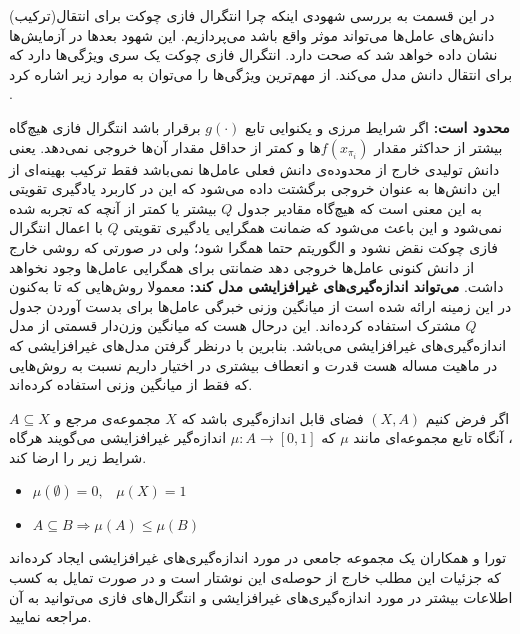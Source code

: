 در این قسمت به بررسی شهودی اینکه چرا انتگرال فازی چوکت برای انتقال(ترکیب) دانش‌های عامل‌ها می‌تواند موثر واقع باشد می‌پردازیم. این شهود بعدها در آزمایش‌ها نشان داده خواهد شد که صحت دارد. انتگرال فازی چوکت یک سری ویژگی‌ها دارد که برای انتقال دانش مدل می‌کند. از مهم‌ترین ویژگی‌ها را می‌توان به موارد زیر اشاره کرد .
\begin{enumerate}
 \textbf{محدود است:} اگر شرایط مرزی و یکنوایی تابع $g(\cdot)$ برقرار باشد انتگرال‌ فازی هیچ‌گاه بیشتر از حداکثر مقدار $f(x_{\pi_i})$ها و کمتر از حداقل مقدار آن‌ها خروجی نمی‌دهد. یعنی دانش تولیدی خارج از محدوده‌ی دانش فعلی عامل‌ها نمی‌باشد فقط ترکیب بهینه‌ای از این دانش‌ها به عنوان خروجی برگشتت داده می‌شود که این در کاربرد یادگیری تقویتی به این معنی است که هیچ‌گاه مقادیر جدول $Q$ بیشتر یا کمتر از آنچه که تجربه شده نمی‌شود و این باعث می‌شود که ضمانت همگرایی یادگیری تقویتی $Q$ با اعمال انتگرال فازی چوکت نقض نشود و الگوریتم حتما همگرا شود؛ ولی در صورتی که روشی خارج از دانش کنونی عامل‌ها خروجی دهد ضمانتی برای همگرایی عامل‌ها وجود نخواهد داشت.
 \textbf{می‌تواند اندازه‌گیری‌های غیرافزایشی مدل کند:} معمولا روش‌هایی که تا به‌کنون در این زمینه ارائه شده است از میانگین وزنی خبرگی عامل‌ها برای بدست آوردن جدول $Q$ مشترک استفاده کرده‌اند. این درحال هست که میانگین وزن‌دار قسمتی از مدل اندازه‌گیری‌های غیرافزایشی می‌باشد. بنابرین با درنظر گرفتن مدل‌های غیرافزایشی که در ماهیت مساله هست قدرت و انعطاف بیشتری در اختیار داریم نسبت به روش‌هایی که فقط از میانگین وزنی استفاده کرده‌اند.
\end{enumerate}

\begin{definition}\setstretch{\thebaselinestretch}\label{non_additive_definition}
اگر فرض کنیم $(X, A)$ فضای قابل اندازه‌گیری باشد که $X$ مجموعه‌ی مرجع و $A \subseteq X$، آنگاه تابع مجموعه‌ای مانند $\mu$ که $\mu: A \rightarrow [0, 1]$ اندازه‌گیر غیرافزایشی می‌گویند هرگاه شرایط زیر را ارضا کند.

\begin{latin}
\begin{itemize}
\item $\mu(\emptyset) = 0, \hspace{10pt} \mu(X) = 1$
\item $A \subseteq B \Rightarrow \mu(A) \leq \mu(B)$
\end{itemize}
\end{latin}
\end{definition}

تورا و همکاران یک مجموعه جامعی در مورد اندازه‌گیری‌های غیرافزایشی ایجاد کرده‌اند که جزئیات این مطلب خارج از حوصله‌ی این نوشتار است و در صورت تمایل به کسب اطلاعات بیشتر در مورد اندازه‌گیری‌های غیرافزایشی و انتگرال‌های فازی می‌توانید به آن مراجعه نمایید.

